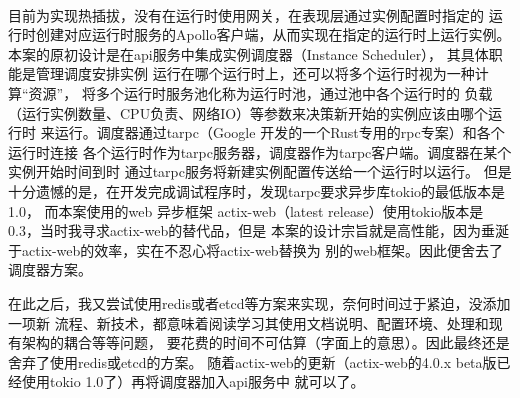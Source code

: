 \begin{keturon}
    \paragraph{} 目前为实现热插拔，没有在运行时使用网关，在表现层通过实例配置时指定的
    运行时创建对应运行时服务的Apollo客户端，从而实现在指定的运行时上运行实例。
    本案的原初设计是在api服务中集成实例调度器（Instance Scheduler），
    其具体职能是管理调度安排实例
    运行在哪个运行时上，还可以将多个运行时视为一种计算“资源”，
    将多个运行时服务池化称为运行时池，通过池中各个运行时的
    负载（运行实例数量、CPU负责、网络IO）等参数来决策新开始的实例应该由哪个运行时
    来运行。调度器通过tarpc（Google 开发的一个Rust专用的rpc专案）和各个运行时连接
    各个运行时作为tarpc服务器，调度器作为tarpc客户端。调度器在某个实例开始时间到时
    通过tarpc服务将新建实例配置传送给一个运行时以运行。
    但是十分遗憾的是，在开发完成调试程序时，发现tarpc要求异步库tokio的最低版本是1.0，
    而本案使用的web 异步框架
    actix-web（latest release）使用tokio版本是0.3，当时我寻求actix-web的替代品，但是
    本案的设计宗旨就是高性能，因为垂涎于actix-web的效率，实在不忍心将actix-web替换为
    别的web框架。因此便舍去了调度器方案。

    在此之后，我又尝试使用redis或者etcd等方案来实现，奈何时间过于紧迫，没添加一项新
    流程、新技术，都意味着阅读学习其使用文档说明、配置环境、处理和现有架构的耦合等等问题，
    要花费的时间不可估算（字面上的意思）。因此最终还是舍弃了使用redis或etcd的方案。
    随着actix-web的更新（actix-web的4.0.x beta版已经使用tokio 1.0了）再将调度器加入api服务中
    就可以了。

\end{keturon}